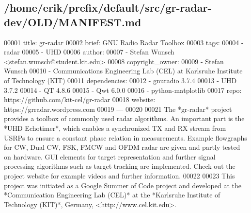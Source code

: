 \subsection{/home/erik/prefix/default/src/gr-\/radar-\/dev/\+O\+L\+D/\+M\+A\+N\+I\+F\+E\+ST.md}

\begin{DoxyCode}
00001 title: gr-radar
00002 brief: GNU Radio Radar Toolbox
00003 tags:
00004   - radar
00005   - UHD
00006 author:
00007   - Stefan Wunsch <stefan.wunsch@student.kit.edu>
00008 copyright\_owner:
00009   - Stefan Wunsch
00010   - Communications Engineering Lab (CEL) at Karlsruhe Institute of Technology (KIT)
00011 dependencies:
00012   - gnuradio 3.7.4
00013   - UHD 3.7.2
00014   - QT 4.8.6
00015   - Qwt 6.0.0
00016   - python-matplotlib
00017 repo: https://github.com/kit-cel/gr-radar
00018 website: https://grradar.wordpress.com
00019 ---
00020 
00021 The *gr-radar* project provides a toolbox of commonly used radar algorithms. An important part is the
       *UHD Echotimer*, which enables a synchronized TX and RX stream from USRPs to ensure a constant phase
       relation in measurements. Example flowgraphs for CW, Dual CW, FSK, FMCW and OFDM radar are given and partly tested
       on hardware. GUI elements for target representation and further signal processing algorithms such as target
       tracking are implemented. Check out the project website for example videos and further information.
00022 
00023 This project was initiated as a Google Summer of Code project and developed at the *Communication
       Engineering Lab (CEL)* at the *Karlsruhe Institute of Technology (KIT)*, Germany, <http://www.cel.kit.edu>.
\end{DoxyCode}
